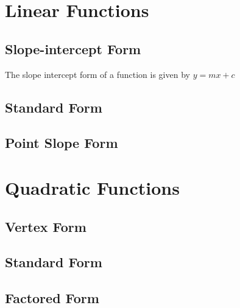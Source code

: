\documentclass[11pt]{article}
\begin{document}
\section{Linear Functions}
	\subsection{Slope-intercept Form}
	The slope intercept form of a function is given by $y=mx+c$
	\subsection{Standard Form}
	\subsection{Point Slope Form}
\section{Quadratic Functions}
	\subsection{Vertex Form}
	\subsection{Standard Form}
	\subsection{Factored Form}
\end{document}
